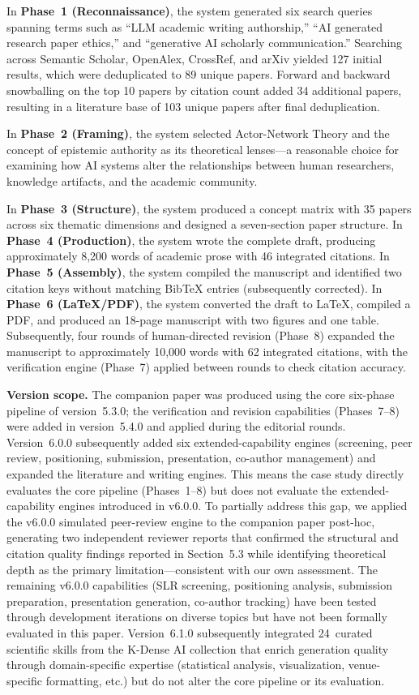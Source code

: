 \documentclass{article}
\begin{document}
In \textbf{Phase~1 (Reconnaissance)}, the system generated six search queries spanning terms such as ``LLM academic writing authorship,'' ``AI generated research paper ethics,'' and ``generative AI scholarly communication.'' Searching across Semantic Scholar, OpenAlex, CrossRef, and arXiv yielded 127 initial results, which were deduplicated to 89 unique papers. Forward and backward snowballing on the top 10 papers by citation count added 34 additional papers, resulting in a literature base of 103 unique papers after final deduplication.

In \textbf{Phase~2 (Framing)}, the system selected Actor-Network Theory and the concept of epistemic authority as its theoretical lenses---a reasonable choice for examining how AI systems alter the relationships between human researchers, knowledge artifacts, and the academic community.

In \textbf{Phase~3 (Structure)}, the system produced a concept matrix with 35 papers across six thematic dimensions and designed a seven-section paper structure. In \textbf{Phase~4 (Production)}, the system wrote the complete draft, producing approximately 8,200 words of academic prose with 46 integrated citations. In \textbf{Phase~5 (Assembly)}, the system compiled the manuscript and identified two citation keys without matching BibTeX entries (subsequently corrected). In \textbf{Phase~6 (\LaTeX/PDF)}, the system converted the draft to \LaTeX, compiled a PDF, and produced an 18-page manuscript with two figures and one table. Subsequently, four rounds of human-directed revision (Phase~8) expanded the manuscript to approximately 10,000 words with 62 integrated citations, with the verification engine (Phase~7) applied between rounds to check citation accuracy.

\medskip
\noindent\textbf{Version scope.} The companion paper was produced using the core six-phase pipeline of version~5.3.0; the verification and revision capabilities (Phases~7--8) were added in version~5.4.0 and applied during the editorial rounds. Version~6.0.0 subsequently added six extended-capability engines (screening, peer review, positioning, submission, presentation, co-author management) and expanded the literature and writing engines. This means the case study directly evaluates the core pipeline (Phases~1--8) but does not evaluate the extended-capability engines introduced in v6.0.0. To partially address this gap, we applied the v6.0.0 simulated peer-review engine to the companion paper post-hoc, generating two independent reviewer reports that confirmed the structural and citation quality findings reported in Section~5.3 while identifying theoretical depth as the primary limitation---consistent with our own assessment. The remaining v6.0.0 capabilities (SLR screening, positioning analysis, submission preparation, presentation generation, co-author tracking) have been tested through development iterations on diverse topics but have not been formally evaluated in this paper. Version~6.1.0 subsequently integrated 24~curated scientific skills from the K-Dense AI collection that enrich generation quality through domain-specific expertise (statistical analysis, visualization, venue-specific formatting, etc.) but do not alter the core pipeline or its evaluation.
\end{document}
